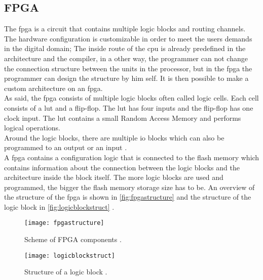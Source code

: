 \subsection{FPGA}


The \gls{fpga} is a circuit that contains multiple logic blocks and routing channels.\\
The hardware configuration is customizable in order to meet the users demands in the digital domain; The inside route of the \gls{cpu} is already predefined in the architecture and the compiler, in a other way, the programmer can not change the connection structure between the units in the processor, but in the \gls{fpga} the programmer can design the structure by him self. It is then possible to make a custom architecture on an \gls{fpga}.  \\
As said, the \gls{fpga} consists of multiple logic blocks often called logic cells. Each cell consists of a \gls{lut} and a flip-flop. The \gls{lut} has four inputs and the flip-flop has one clock input. The \gls{lut} contains a small Random Access Memory and performs logical operations. \\
Around the logic blocks, there are multiple \gls{io} blocks which can also be programmed to an output or an input \citep {FPGA_youtube} \citep{FPGA_center} \citep{FPGA_toronto}.  \\
A \gls{fpga} contains a configuration logic that is connected to the flash memory which contains information about the connection between the logic blocks and the architecture inside the block itself. The more logic blocks are used and programmed, the bigger the flash memory storage size has to be. An overview of the structure of the \gls{fpga} is shown in \autoref{fig:fpgastructure} and the structure of the logic block in \autoref{fig:logicblockstruct} \citep {FPGA_youtube} \citep{FPGA_center} \citep{FPGA_toronto}.  \\
\newline

\begin{figure}[htbp]
	\centering
	\texttt{[image: fpgastructure]}
	\caption{Scheme of FPGA components \citep{FPGA_toronto}.}
	\label{fig:fpgastructure}
\end{figure}

\begin{figure}[htbp]
	\centering
	\texttt{[image: logicblockstruct]}
	\caption{Structure of a logic block \citep{FPGA_toronto}.}
	\label{fig:logicblockstruct}
\end{figure}


